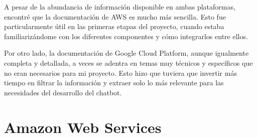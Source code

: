 A pesar de la abundancia de información disponible en ambas plataformas, encontré que la documentación de AWS es mucho más sencilla. Esto fue particularmente útil en las primeras etapas del proyecto, cuando estaba familiarizándome con los diferentes componentes y cómo integrarlos entre ellos.

Por otro lado, la documentación de Google Cloud Platform, aunque igualmente completa y detallada, a veces se adentra en temas muy técnicos y específicos que no eran necesarios para mi proyecto. Esto hizo que tuviera que invertir más tiempo en filtrar la información y extraer solo lo más relevante para las necesidades del desarrollo del chatbot.


\section{Amazon Web Services}\label{AWS}

